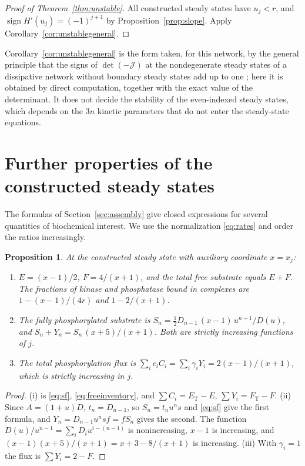 \documentclass[11pt]{article}
\theoremstyle{plain}
\newtheorem{proposition}[theorem]{Proposition}
\theoremstyle{definition}
\theoremstyle{remark}
\numberwithin{equation}{section}
\newcommand{\ET}{E_{\mathrm T}}
\newcommand{\FT}{F_{\mathrm T}}
\newcommand{\JS}{\mathcal J}
\DeclareMathOperator{\sign}{sign}
\begin{document}
\begin{proof}[Proof of Theorem~\ref{thm:unstable}]
All constructed steady states have \(u_j<r\), and \(\sign H'(u_j)=(-1)^{j+1}\) by
Proposition~\ref{prop:slope}. Apply Corollary~\ref{cor:unstablegeneral}.
\end{proof}

Corollary~\ref{cor:unstablegeneral} is the form taken, for this network, by the general
principle that the signs of \(\det(-\JS)\) at the nondegenerate steady states of a dissipative
network without boundary steady states add up to one \cite{CFMW2017}; here it is obtained by
direct computation, together with the exact value of the determinant. It does not decide the
stability of the even-indexed steady states, which depends on the \(3n\) kinetic parameters
that do not enter the steady-state equations.

\section{Further properties of the constructed steady states}\label{sec:properties}
The formulas of Section~\ref{sec:assembly} give closed expressions for several quantities of
biochemical interest. We use the normalization \eqref{eq:rates} and order the ratios
increasingly.

\begin{proposition}\label{prop:properties}
At the constructed steady state with auxiliary coordinate \(x=x_j\):
\begin{enumerate}
\item[\textup{(i)}] \(E=(x-1)/2\), \(F=4/(x+1)\), and the total free substrate equals \(E+F\).
The fractions of kinase and phosphatase bound in complexes are \(1-(x-1)/(4r)\) and
\(1-2/(x+1)\).
\item[\textup{(ii)}] The fully phosphorylated substrate is
\(S_n=\tfrac12D_{n-1}\,(x-1)\,u^{n-1}/D(u)\), and \(S_n+Y_n=S_n\,(x+5)/(x+1)\). Both are
strictly increasing functions of \(j\).
\item[\textup{(iii)}] The total phosphorylation flux is
\(\sum_ic_iC_i=\sum_i\gamma_iY_i=2(x-1)/(x+1)\), which is strictly increasing in \(j\).
\end{enumerate}
\end{proposition}
\begin{proof}
(i) is \eqref{eq:sf}, \eqref{eq:freeinventory}, and \(\sum C_i=\ET-E\), \(\sum Y_i=\FT-F\).
(ii) Since \(A=(1+u)D\), \(t_n=D_{n-1}\), so \(S_n=t_nu^ns\) and \eqref{eq:sf} give the first
formula, and \(Y_n=D_{n-1}u^nsf=fS_n\) gives the second. The function
\(D(u)/u^{n-1}=\sum_iD_iu^{i-(n-1)}\) is nonincreasing, \(x-1\) is increasing, and
\((x-1)(x+5)/(x+1)=x+3-8/(x+1)\) is increasing. (iii) With \(\gamma_i=1\) the flux is
\(\sum Y_i=2-F\).
\end{proof}
\end{document}
